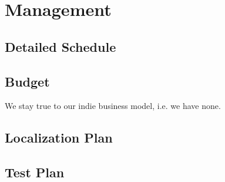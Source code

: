 \chapter{Management}
\section{Detailed Schedule} %
\section{Budget}
We stay true to our indie business model, i.e. we have none.
\section{Localization Plan} %
\section{Test Plan} %
